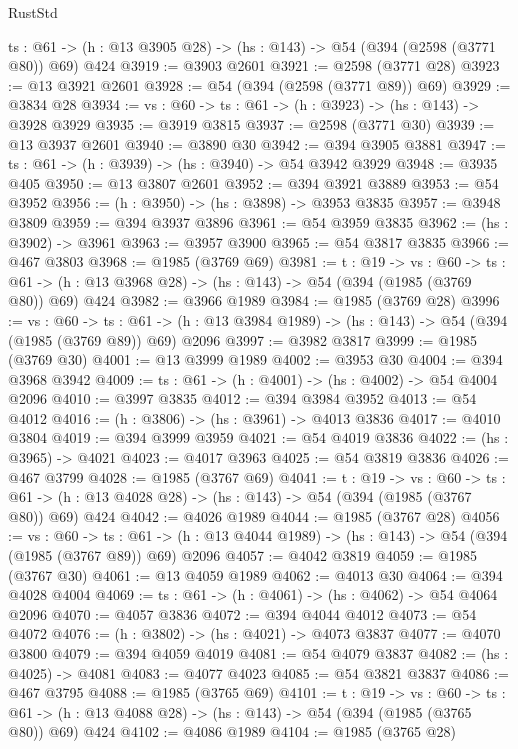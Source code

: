 \begin{lexlean}{RustStd}
\begin{coremodule}
{\begin{coremodule}
{{{{{{{{  {ts : @61} -> (h : @13 @3905 @28) -> (hs : @143) -> @54 (@394 (@2598 (@3771 @80)) @69) @424
@3919 := @3903 @2601
@3921 := @2598 (@3771 @28)
@3923 := @13 @3921 @2601
@3928 := @54 (@394 (@2598 (@3771 @89)) @69)
@3929 := @3834 @28
@3934 := {vs : @60} -> {ts : @61} -> (h : @3923) -> (hs : @143) -> @3928 @3929
@3935 := @3919 @3815
@3937 := @2598 (@3771 @30)
@3939 := @13 @3937 @2601
@3940 := @3890 @30
@3942 := @394 @3905 @3881
@3947 := {ts : @61} -> (h : @3939) -> (hs : @3940) -> @54 @3942 @3929
@3948 := @3935 @405
@3950 := @13 @3807 @2601
@3952 := @394 @3921 @3889
@3953 := @54 @3952
@3956 := (h : @3950) -> (hs : @3898) -> @3953 @3835
@3957 := @3948 @3809
@3959 := @394 @3937 @3896
@3961 := @54 @3959 @3835
@3962 := (hs : @3902) -> @3961
@3963 := @3957 @3900
@3965 := @54 @3817 @3835
@3966 := @467 @3803
@3968 := @1985 (@3769 @69)
@3981 := {t : @19} ->
  {vs : @60} ->
  {ts : @61} -> (h : @13 @3968 @28) -> (hs : @143) -> @54 (@394 (@1985 (@3769 @80)) @69) @424
@3982 := @3966 @1989
@3984 := @1985 (@3769 @28)
@3996 := {vs : @60} ->
  {ts : @61} -> (h : @13 @3984 @1989) -> (hs : @143) -> @54 (@394 (@1985 (@3769 @89)) @69) @2096
@3997 := @3982 @3817
@3999 := @1985 (@3769 @30)
@4001 := @13 @3999 @1989
@4002 := @3953 @30
@4004 := @394 @3968 @3942
@4009 := {ts : @61} -> (h : @4001) -> (hs : @4002) -> @54 @4004 @2096
@4010 := @3997 @3835
@4012 := @394 @3984 @3952
@4013 := @54 @4012
@4016 := (h : @3806) -> (hs : @3961) -> @4013 @3836
@4017 := @4010 @3804
@4019 := @394 @3999 @3959
@4021 := @54 @4019 @3836
@4022 := (hs : @3965) -> @4021
@4023 := @4017 @3963
@4025 := @54 @3819 @3836
@4026 := @467 @3799
@4028 := @1985 (@3767 @69)
@4041 := {t : @19} ->
  {vs : @60} ->
  {ts : @61} -> (h : @13 @4028 @28) -> (hs : @143) -> @54 (@394 (@1985 (@3767 @80)) @69) @424
@4042 := @4026 @1989
@4044 := @1985 (@3767 @28)
@4056 := {vs : @60} ->
  {ts : @61} -> (h : @13 @4044 @1989) -> (hs : @143) -> @54 (@394 (@1985 (@3767 @89)) @69) @2096
@4057 := @4042 @3819
@4059 := @1985 (@3767 @30)
@4061 := @13 @4059 @1989
@4062 := @4013 @30
@4064 := @394 @4028 @4004
@4069 := {ts : @61} -> (h : @4061) -> (hs : @4062) -> @54 @4064 @2096
@4070 := @4057 @3836
@4072 := @394 @4044 @4012
@4073 := @54 @4072
@4076 := (h : @3802) -> (hs : @4021) -> @4073 @3837
@4077 := @4070 @3800
@4079 := @394 @4059 @4019
@4081 := @54 @4079 @3837
@4082 := (hs : @4025) -> @4081
@4083 := @4077 @4023
@4085 := @54 @3821 @3837
@4086 := @467 @3795
@4088 := @1985 (@3765 @69)
@4101 := {t : @19} ->
  {vs : @60} ->
  {ts : @61} -> (h : @13 @4088 @28) -> (hs : @143) -> @54 (@394 (@1985 (@3765 @80)) @69) @424
@4102 := @4086 @1989
@4104 := @1985 (@3765 @28)
}}}}}}}}
\end{coremodule}}
\end{coremodule}
\end{lexlean}
